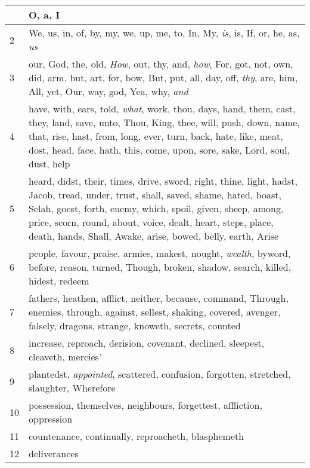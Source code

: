 \begin{longtable}{l|p{3.75in}}
\hline \hline
\endlastfoot
1 & O, a, I \\ \hline
2 & We, us, in, of, by, my, we, up, me, to, In, My, \emph{is}, is, If, or, he, as, \emph{us} \\ \hline
3 & our, God, the, old, \emph{How}, out, thy, and, \emph{how}, For, got, not, own, did, arm, but, art, for, bow, But, put, all, day, off, \emph{thy}, are, him, All, yet, Our, way, god, Yea, why, \emph{and} \\ \hline
4 & have, with, ears, told, \emph{what}, work, thou, days, hand, them, cast, they, land, save, unto, Thou, King, thee, will, push, down, name, that, rise, hast, from, long, ever, turn, back, hate, like, meat, dost, head, face, hath, this, come, upon, sore, sake, Lord, soul, dust, help \\ \hline
5 & heard, didst, their, times, drive, sword, right, thine, light, hadst, Jacob, tread, under, trust, shall, saved, shame, hated, boast, Selah, goest, forth, enemy, which, spoil, given, sheep, among, price, scorn, round, about, voice, dealt, heart, steps, place, death, hands, Shall, Awake, arise, bowed, belly, earth, Arise \\ \hline
6 & people, favour, praise, armies, makest, nought, \emph{wealth}, byword, before, reason, turned, Though, broken, shadow, search, killed, hidest, redeem \\ \hline
7 & fathers, heathen, afflict, neither, because, command, Through, enemies, through, against, sellest, shaking, covered, avenger, falsely, dragons, strange, knoweth, secrets, counted \\ \hline
8 & increase, reproach, derision, covenant, declined, sleepest, cleaveth, mercies' \\ \hline
9 & plantedst, \emph{appointed}, scattered, confusion, forgotten, stretched, slaughter, Wherefore \\ \hline
10 & possession, themselves, neighbours, forgettest, affliction, oppression \\ \hline
11 & countenance, continually, reproacheth, blasphemeth \\ \hline
12 & deliverances \\ \hline
\end{longtable}






 



